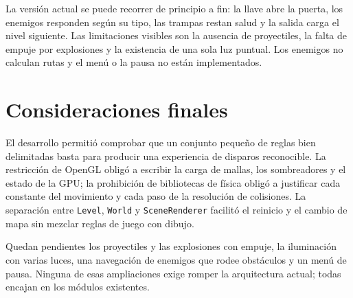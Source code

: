 \documentclass[12pt,a4paper]{article}
\begin{document}
La versión actual se puede recorrer de principio a fin: la llave abre la puerta,
los enemigos responden según su tipo, las trampas restan salud y la salida carga
el nivel siguiente. Las limitaciones visibles son la ausencia de proyectiles, la
falta de empuje por explosiones y la existencia de una sola luz puntual. Los
enemigos no calculan rutas y el menú o la pausa no están implementados.

\section{Consideraciones finales}

El desarrollo permitió comprobar que un conjunto pequeño de reglas bien
delimitadas basta para producir una experiencia de disparos reconocible. La
restricción de OpenGL obligó a escribir la carga de mallas, los sombreadores y
el estado de la GPU; la prohibición de bibliotecas de física obligó a justificar
cada constante del movimiento y cada paso de la resolución de colisiones. La
separación entre \texttt{Level}, \texttt{World} y \texttt{SceneRenderer} facilitó
el reinicio y el cambio de mapa sin mezclar reglas de juego con dibujo.

Quedan pendientes los proyectiles y las explosiones con empuje, la iluminación
con varias luces, una navegación de enemigos que rodee obstáculos y un menú de
pausa. Ninguna de esas ampliaciones exige romper la arquitectura actual; todas
encajan en los módulos existentes.
\end{document}
